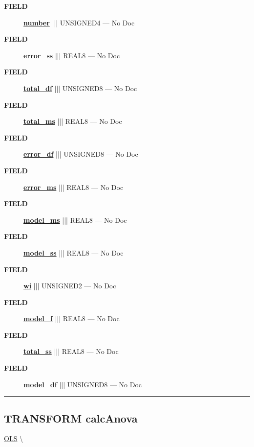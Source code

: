 \par
\begin{description}
\item [\colorbox{tagtype}{\color{white} \textbf{\textsf{FIELD}}}] \textbf{\underline{number}} ||| UNSIGNED4 --- No Doc
\item [\colorbox{tagtype}{\color{white} \textbf{\textsf{FIELD}}}] \textbf{\underline{error\_ss}} ||| REAL8 --- No Doc
\item [\colorbox{tagtype}{\color{white} \textbf{\textsf{FIELD}}}] \textbf{\underline{total\_df}} ||| UNSIGNED8 --- No Doc
\item [\colorbox{tagtype}{\color{white} \textbf{\textsf{FIELD}}}] \textbf{\underline{total\_ms}} ||| REAL8 --- No Doc
\item [\colorbox{tagtype}{\color{white} \textbf{\textsf{FIELD}}}] \textbf{\underline{error\_df}} ||| UNSIGNED8 --- No Doc
\item [\colorbox{tagtype}{\color{white} \textbf{\textsf{FIELD}}}] \textbf{\underline{error\_ms}} ||| REAL8 --- No Doc
\item [\colorbox{tagtype}{\color{white} \textbf{\textsf{FIELD}}}] \textbf{\underline{model\_ms}} ||| REAL8 --- No Doc
\item [\colorbox{tagtype}{\color{white} \textbf{\textsf{FIELD}}}] \textbf{\underline{model\_ss}} ||| REAL8 --- No Doc
\item [\colorbox{tagtype}{\color{white} \textbf{\textsf{FIELD}}}] \textbf{\underline{wi}} ||| UNSIGNED2 --- No Doc
\item [\colorbox{tagtype}{\color{white} \textbf{\textsf{FIELD}}}] \textbf{\underline{model\_f}} ||| REAL8 --- No Doc
\item [\colorbox{tagtype}{\color{white} \textbf{\textsf{FIELD}}}] \textbf{\underline{total\_ss}} ||| REAL8 --- No Doc
\item [\colorbox{tagtype}{\color{white} \textbf{\textsf{FIELD}}}] \textbf{\underline{model\_df}} ||| UNSIGNED8 --- No Doc
\end{description}





\rule{\linewidth}{0.5pt}
\subsection*{\textsf{\colorbox{headtoc}{\color{white} TRANSFORM}
calcAnova}}

\hypertarget{ecldoc:linearregression.ols.calcanova}{}
\hspace{0pt} \hyperlink{ecldoc:linearregression.ols}{OLS} \textbackslash 

